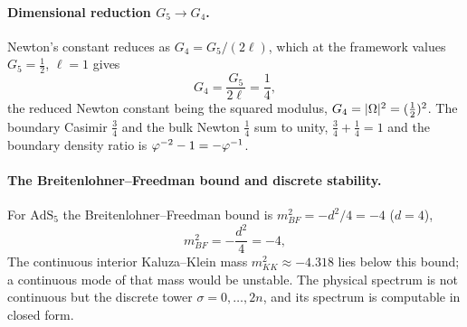 \paragraph{Dimensional reduction $G_5\to G_4$.}
Newton's constant reduces as $G_4=G_5/(2\ell)$, which at the framework values $G_5=\tfrac12$, $\ell=1$ gives
\begin{equation}\label{eq:kk-G4}
  G_4=\frac{G_5}{2\ell}=\frac{1}{4} ,
\end{equation}
the reduced Newton constant being the squared modulus, $G_4=|\Omega|^{2}=(\tfrac12)^{2}$.
The boundary Casimir $\tfrac34$ and the bulk Newton $\tfrac14$ sum to unity,
$\tfrac34+\tfrac14=1$ and the boundary density ratio is $\varphi^{-2}-1=-\varphi^{-1}$.


\paragraph{The Breitenlohner--Freedman bound and discrete stability.}
For $\mathrm{AdS}_5$ the Breitenlohner--Freedman bound is $m^2_{BF}=-d^2/4=-4$ ($d=4$),
\begin{equation}\label{eq:kk-BF}
  m^2_{BF}=-\frac{d^{2}}{4}=-4 ,
\end{equation}
The continuous interior Kaluza--Klein mass $m^2_{KK}\approx-4.318$ lies below this bound; a continuous mode
of that mass would be unstable. The physical spectrum is not continuous but the discrete tower
$\sigma=0,\dots,2n$, and its spectrum is computable in closed form.

